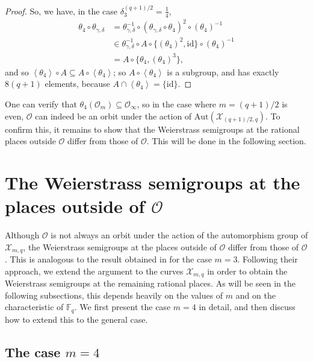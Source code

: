 \documentclass[12pt]{amsart}
\theoremstyle{remark}
\theoremstyle{definition}
\begin{document}
\begin{proof}
So, we have, in the case $\delta_3^{(q+1)/2}=\frac{1}{4}$,
\begin{align*}
\theta_{4}\circ\theta_{\gamma,\delta} & =\theta_{\gamma,\delta}^{-1}\circ(\theta_{\gamma,\delta}\circ\theta_{4})^{2}\circ(\theta_{4})^{-1}\\
 & \in\theta_{\gamma,\delta}^{-1}\circ A\circ\{(\theta_4)^2,\mathrm{id}\}\circ(\theta_{4})^{-1}\\
 & =A\circ\{\theta_{4},(\theta_{4})^{3}\},
\end{align*}
and so $\left\langle \theta_{4}\right\rangle \circ A\subseteq A \circ \left\langle \theta_{4}\right\rangle $;
so $A\circ \left\langle \theta_{4}\right\rangle $ is a subgroup, and has
exactly $8(q+1)$ elements, because $A\cap\left\langle \theta_{4}\right\rangle =\{\mathrm{id}\}$.
    

\end{proof}

One can verify that $\theta_4(\mathcal{O}_m) \subseteq \mathcal{O}_{\infty}$,
so in the case where $m = (q+1)/2$ is even, $\mathcal{O}$ can indeed be an
orbit under the action of $\textrm{Aut}(\mathcal{X}_{(q+1)/2,q})$. To confirm
this, it remains to show that the Weierstrass semigroups at the rational places
outside $\mathcal{O}$ differ from those of $\mathcal{O}$. This will be done in
the following section.

\section{\texorpdfstring
{The Weierstrass semigroups at the places outside of $\mathcal{O}$}
{The Weierstrass semigroups at the places outside of O}}
\label{sec:weierstrass-other}

Although $\mathcal{O}$ is not always an orbit under the action of the
automorphism group of $\mathcal{X}_{m,q}$, the Weierstrass semigroups at the
places outside of $\mathcal{O}$ differ from those of $\mathcal{O}$. This is
analogous to the result obtained in \cite{BMV} for the case $m = 3$. Following
their approach, we extend the argument to the curves $\mathcal{X}_{m,q}$ in
order to obtain the Weierstrass semigroups at the remaining rational places.
As will be seen in the following subsections, this depends heavily on the
values of $m$ and on the characteristic of $\mathbb{F}_q$. We first present
the case $m = 4$ in detail, and then discuss how to extend this to the general
case.

\subsection{\texorpdfstring{The case $m = 4$}{The case m = 4}}
\end{document}

